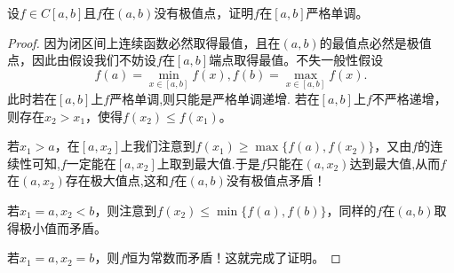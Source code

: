 \documentclass[../../main.tex]{subfiles}%
\begin{document}
\begin{proposition}[没有极值点则严格单调]\label{proposition:没有极值点则严格单调}
设\(f\in C[a,b]\)且\(f\)在\((a,b)\)没有极值点，证明\(f\)在\([a,b]\)严格单调。
\end{proposition}
\begin{proof}

因为闭区间上连续函数必然取得最值，且在\((a,b)\)的最值点必然是极值点，因此由假设我们不妨设\(f\)在\([a,b]\)端点取得最值。不失一般性假设
\[
f(a)=\min_{x\in[a,b]}f(x),f(b)=\max_{x\in[a,b]}f(x).
\]
此时若在\([a,b]\)上\(f\)严格单调,则只能是严格单调递增.
若在\([a,b]\)上\(f\)不严格递增，则存在\(x_2>x_1\)，使得\(f(x_2)\leqslant f(x_1)\)。

若\(x_1>a\)，在\([a,x_2]\)上我们注意到\(f(x_1)\geqslant\max\{f(a),f(x_2)\}\)，又由$f$的连续性可知,$f$一定能在$[a,x_2]$上取到最大值.于是\(f\)只能在\((a,x_2)\)达到最大值,从而$f$在\((a,x_2)\)存在极大值点,这和\(f\)在\((a,b)\)没有极值点矛盾！

若\(x_1 = a,x_2 < b\)，则注意到\(f(x_2)\leqslant\min\{f(a),f(b)\}\)，同样的\(f\)在\((a,b)\)取得极小值而矛盾。

若\(x_1 = a,x_2 = b\)，则\(f\)恒为常数而矛盾！这就完成了证明。

\end{proof}
\end{document}
